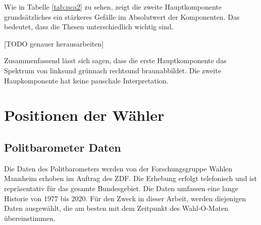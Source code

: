 Wie in Tabelle \ref{tab:pca2} zu sehen, zeigt die zweite Hauptkomponente grundsätzliches ein stärkeres Gefälle im Absolutwert der Komponenten. Das bedeutet, dass die Thesen unterschiedlich wichtig sind.

[TODO genauer herausarbeiten]
\blindtext

Zusammenfassend lässt sich sagen, dass die erste Hauptkomponente das Spektrum von \glqq links\grqq und \glqq grün\grqq nach \glqq rechts\grqq und \glqq braun\grqq abbildet. Die zweite Haupkomponente hat keine pauschale Interpretation.

\section{Positionen der Wähler}\label{Sec-Wählerpositionen}

\subsection{Politbarometer Daten}
Die Daten des Politbarometers \citep{politbarometer} werden von der Forschungsgruppe Wahlen Mannheim erhoben im Auftrag des ZDF. Die Erhebung erfolgt telefonisch und ist repräsentativ für das gesamte Bundesgebiet. Die Daten umfassen eine lange Historie von 1977 bis 2020. Für den Zweck in dieser Arbeit, werden diejenigen Daten ausgewählt, die am besten mit dem Zeitpunkt des Wahl-O-Maten übereinstimmen.

